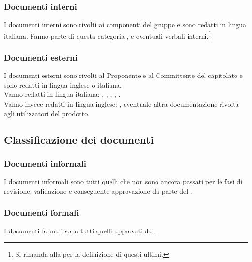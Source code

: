 \subsubsection{Documenti interni}
I documenti interni sono rivolti ai componenti del gruppo e sono redatti in lingua italiana. Fanno parte di questa categoria \NormeDiProgetto, \StudioDiFattibilita{} e eventuali verbali interni.\footnote[1]{Si rimanda alla  per la definizione di questi ultimi.}

\subsubsection{Documenti esterni}
I documenti esterni sono rivolti al Proponente e al Committente del capitolato e sono redatti in lingua inglese o italiana.\\
Vanno redatti in lingua italiana: \PianoDiProgetto, \PianoDiQualifica, \SpecificaTecnica, \DefinizioneDiProdotto, \Glossario.\\
Vanno invece redatti in lingua inglese: \ManualeUtente, eventuale altra documentazione rivolta agli utilizzatori del prodotto.

\subsection{Classificazione dei documenti}
\subsubsection{Documenti informali}
I documenti informali sono tutti quelli che non sono ancora passati per le fasi di revisione, validazione e conseguente approvazione da parte del \Responsabile.

\subsubsection{Documenti formali}
I documenti formali sono tutti quelli approvati dal \Responsabile.

